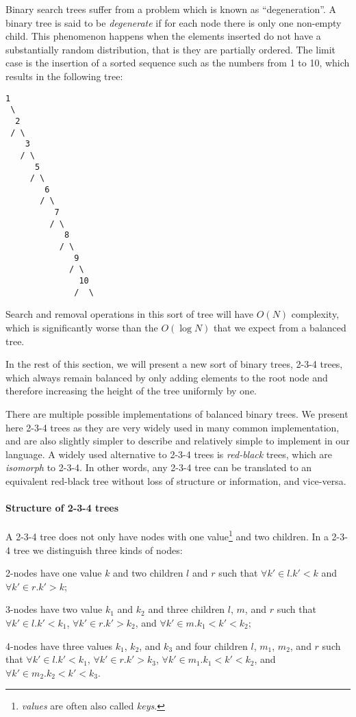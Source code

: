 Binary search trees suffer from a problem which is known as ``degeneration''. A binary tree is said to be \textit{degenerate} if for each node there is only one non-empty child. This phenomenon happens when the elements inserted do not have a substantially random distribution, that is they are partially ordered. The limit case is the insertion of a sorted sequence such as the numbers from 1 to 10, which results in the following tree:

\begin{lstlisting}
1
 \
  2
 / \
    3
   / \
      5
     / \
        6
       / \
          7
         / \
            8
           / \
              9
             / \
               10
              /  \
\end{lstlisting}

Search and removal operations in this sort of tree will have $O(N)$ complexity, which is significantly worse than the $O(\log N)$ that we expect from a balanced tree.

In the rest of this section, we will present a new sort of binary trees, 2-3-4 trees, which always remain balanced by only adding elements to the root node and therefore increasing the height of the tree uniformly by one.


There are multiple possible implementations of balanced binary trees. We present here 2-3-4 trees as they are very widely used in many common implementation, and are also slightly simpler to describe and relatively simple to implement in our language. A widely used alternative to 2-3-4 trees is \textit{red-black} trees, which are \textit{isomorph} to 2-3-4. In other words, any 2-3-4 tree can be translated to an equivalent red-black tree without loss of structure or information, and vice-versa.

\paragraph{Structure of 2-3-4 trees}
A 2-3-4 tree does not only have nodes with one value\footnote{\textit{values} are often also called \textit{keys}.} and two children. In a 2-3-4 tree we distinguish three kinds of nodes: 
\begin{inparaenum}[\itshape i\upshape)]
\item 2-nodes have one value $k$ and two children $l$ and $r$ such that $\forall k' \in l . k' < k$ and $\forall k' \in r . k' > k$;
\item 3-nodes have two value $k_1$ and $k_2$ and three children $l$, $m$, and $r$ such that $\forall k' \in l . k' < k_1$, $\forall k' \in r . k' > k_2$, and $\forall k' \in m . k_1 < k' < k_2$;
\item 4-nodes have three values $k_1$, $k_2$, and $k_3$ and four children $l$, $m_1$, $m_2$, and $r$ such that $\forall k' \in l . k' < k_1$, $\forall k' \in r . k' > k_3$, $\forall k' \in m_1 . k_1 < k' < k_2$, and $\forall k' \in m_2 . k_2 < k' < k_3$.
\end{inparaenum}

